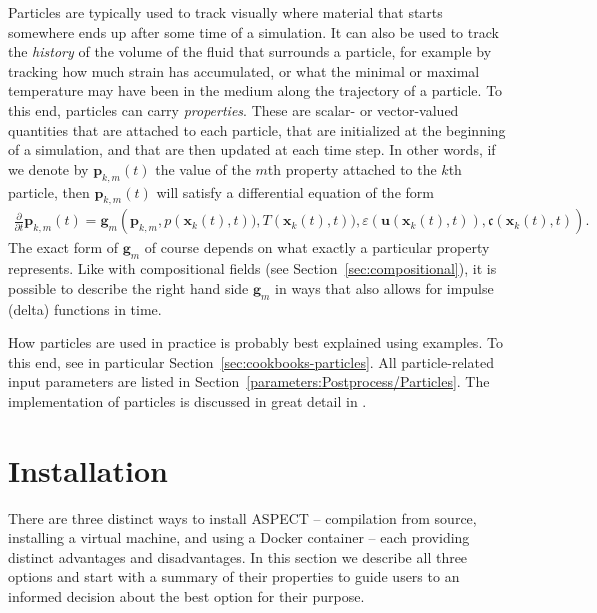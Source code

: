 \documentclass{article}
\begin{document}
Particles are typically used to track visually where material that starts
somewhere ends up after some time of a simulation. It can also be used to track
the \textit{history} of the volume of the fluid that surrounds a particle, for
example by tracking how much strain has accumulated, or what the minimal or maximal
temperature may have been in the medium along the trajectory of a particle. To
this end, particles can carry \textit{properties}. These are scalar-
or vector-valued quantities that are attached to each particle, that are
initialized at the beginning of a simulation, and that are then updated at each time step. In other words, if we
denote by $\mathbf p_{k,m}(t)$ the value of the $m$th property attached to
the $k$th particle, then $\mathbf p_{k,m}(t)$ will satisfy a differential
equation of the form
\begin{align*}
  \frac{\partial}{\partial t} \mathbf p_{k,m}(t)
  = \mathbf g_m\left(\mathbf p_{k,m}, 
  p(\mathbf x_k(t),t)), T(\mathbf x_k(t),t)), 
  \varepsilon(\mathbf u(\mathbf x_k(t),t)),
  \mathfrak c(\mathbf x_k(t),t)\right).
\end{align*}
The exact form of $\mathbf g_m$ of course depends on what exactly a particular
property represents. Like with compositional fields (see
Section~\ref{sec:compositional}), it is possible to describe the right hand side
$\mathbf g_m$ in ways that also allows for impulse (delta) functions in time.

How particles are used in practice is probably best explained using examples. To
this end, see in particular Section~\ref{sec:cookbooks-particles}. All
particle-related input parameters are listed in
Section~\ref{parameters:Postprocess/Particles}. The implementation of particles is
discussed in great detail in \cite{GHPB17}.


\section{Installation}
\label{sec:installation}

There are three distinct ways to install ASPECT -- compilation
from source, installing a virtual machine, and using a Docker container --
each providing distinct advantages and disadvantages. In this section we
describe all three options and start with a summary of their properties to
guide users to an informed decision about the best option for their purpose.
\end{document}
